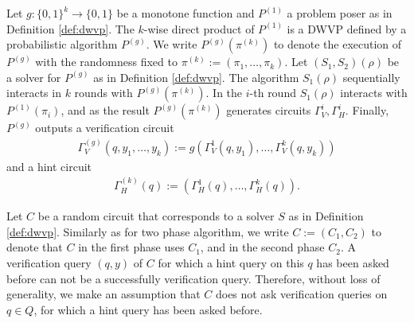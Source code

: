 \begin{definition}
Let $g: \{0,1\}^{k} \rightarrow \{0,1\}$ be a monotone function and $P^{(1)}$ a problem poser as in Definition \ref{def:dwvp}.
The $k$-wise direct product of $P^{(1)}$ is a DWVP defined by a probabilistic algorithm $P^{(g)}$.
We write $P^{(g)}(\pi^{(k)})$ to denote the execution of $P^{(g)}$ with the randomness fixed to $\pi^{(k)} := (\pi_1, \dots, \pi_k)$.
Let $(S_1, S_2)(\rho)$ be a solver for $P^{(g)}$ as in Definition \ref{def:dwvp}.
The algorithm $S_1(\rho)$ sequentially interacts in $k$ rounds with $P^{(g)}(\pi^{(k)})$.
In the $i$-th round $S_1(\rho)$ interacts with $P^{(1)}(\pi_i)$,
and as the result $P^{(g)}(\pi^{(k)})$ generates circuits $\Gamma_V^i, \Gamma_H^i$.
Finally, $P^{(g)}$ outputs a verification circuit
\begin{align*}
  \Gamma_V^{(g)} (q, y_1, \dots, y_k) := g(\Gamma_V^{1}(q, y_1), \dots, \Gamma_V^{k}(q, y_k))
\end{align*}
and a hint circuit
\begin{align*}
  \Gamma_H^{(k)} (q) := (\Gamma_H^{1}(q), \dots, \Gamma_H^{k}(q)).
\end{align*}
\end{definition}
%
Let $C$ be a random circuit that corresponds to a solver $S$ as in Definition \ref{def:dwvp}.
Similarly as for two phase algorithm, we write $C := (C_1, C_2)$ to denote that $C$ in the first phase uses $C_1$,
and in the second phase $C_2$.
%
A verification query $(q,y)$ of $C$ for which a hint query on this $q$ has been asked before can not be a successfully verification query.
Therefore, without loss of generality, we make an assumption that $C$ does not ask verification queries on $q \in Q$,
for which a hint query has been asked before.
%
